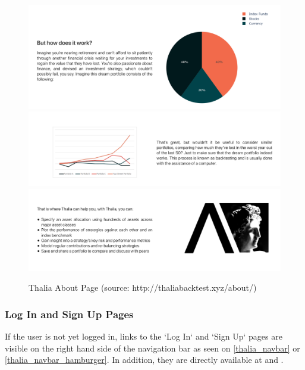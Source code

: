 \documentclass[main.tex]{subfiles}
\begin{document}
\begin{figure}[H]
   \centering
   \includegraphics[width=\textwidth,keepaspectratio]{08Appendices/081User/081Pictures/about_1.png}
   \includegraphics[width=\textwidth,keepaspectratio]{08Appendices/081User/081Pictures/about_2.png}
   \includegraphics[width=\textwidth,keepaspectratio]{08Appendices/081User/081Pictures/about_3.png}
   \caption{Thalia About Page (source: http://thaliabacktest.xyz/about/)}
   \label{thalia_about}
\end{figure}

\subsubsection{Log In and Sign Up Pages}
If the user is not yet logged in, links to the `Log In` and `Sign Up` pages are visible on the right hand side of the navigation bar as seen on \figurename{\ref{thalia_navbar}} or \figurename{\ref{thalia_navbar_hamburger}}. In addition, they are directly available at  and .
\end{document}
